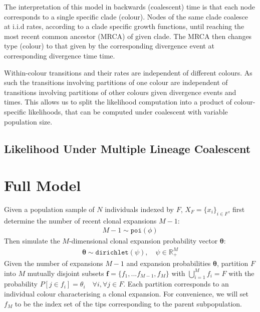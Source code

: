 \documentclass{report}
\newcommand{\R}{\mathbb{R}}
\theoremstyle{definition}
\begin{document}
The interpretation of this model in backwards (coalescent) time is that each node corresponds to a single specific clade (colour). Nodes of the same clade coalesce at i.i.d rates, according to a clade specific growth functions, until reaching the most recent common ancestor (MRCA) of given clade. The MRCA then changes type (colour) to that given by the corresponding divergence event at corresponding divergence time time. 

Within-colour transitions and their rates are independent of different colours. As such the transitions involving partitions of one colour  are independent of transitions involving partitions of other colours given divergence events and times. This allows us to split the likelihood computation into a product of colour-specific likelihoods, that can be computed under coalescent with variable population size.\\
\subsection{Likelihood Under Multiple Lineage Coalescent}
\section{Full Model}
Given a population sample of $N$ individuals indexed by $F$, $X_F = \{x_i\}_{i \in F}$, first determine the number of recent clonal expansions $M-1$:
\begin{gather}
M-1 \sim \texttt{poi}(\phi)
\end{gather}
Then simulate the $M$-dimensional clonal expansion probability vector $\pmb{\theta}$:
\begin{gather}
\pmb{\theta} \sim \texttt{dirichlet}(\psi), \quad \psi \in \R_+^{M} 
\end{gather}
Given the number of expansions $M-1$ and expansion probabilities $\pmb{\theta}$, partition $F$ into $M$ mutually disjoint subsets $\mathbf{f}=\{f_1, ... f_{M-1}, f_{M}\}$ with $\bigcup\limits_{i=1}^{M} f_{i} = F$ with the probability $P[j\in f_{i}]=\theta_i\quad \forall i,\forall j \in F$.  
Each partition corresponds to an individual colour characterising a clonal expansion. For convenience, we will set $f_{M}$ to be the index set of the tips corresponding to the parent subpopulation.
\end{document}

